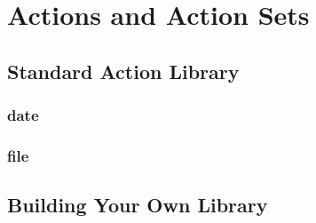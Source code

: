 \chapter{Actions and Action Sets}



\section{Standard Action Library}

\subsection{date}
\printtabDateStd

\subsection{file}
\printtabFileStd

\section{Building Your Own Library}

